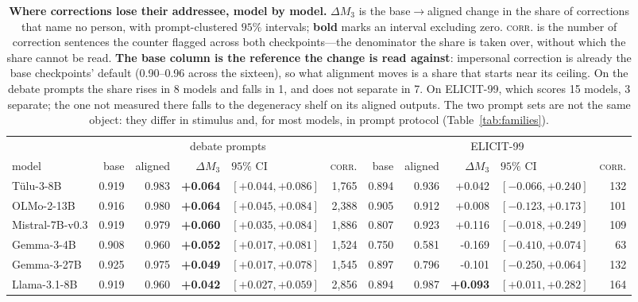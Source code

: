 \begin{table}[tb]\centering\scriptsize\setlength{\tabcolsep}{2.8pt}
\caption{\textbf{Where corrections lose their addressee, model by model.} $\Delta M_3$ is the base$\rightarrow$aligned change in the share of corrections that name no person, with prompt-clustered $95\%$ intervals; \textbf{bold} marks an interval excluding zero. \textsc{corr.} is the number of correction sentences the counter flagged across both checkpoints---the denominator the share is taken over, without which the share cannot be read. \textbf{The base column is the reference the change is read against}: impersonal correction is already the base checkpoints' default (0.90--0.96 across the sixteen), so what alignment moves is a share that starts near its ceiling. On the debate prompts the share rises in 8 models and falls in 1, and does not separate in 7. On ELICIT-99, which scores 15 models, 3 separate; the one not measured there falls to the degeneracy shelf on its aligned outputs. The two prompt sets are not the same object: they differ in stimulus and, for most models, in prompt protocol (Table~\ref{tab:families}).}
\label{tab:m3}
\begin{tabular}{lrrrlr@{\hspace{8pt}}rrrlr}
\toprule
 & \multicolumn{5}{c}{debate prompts} & \multicolumn{5}{c}{ELICIT-99} \\
\cmidrule(lr){2-6}\cmidrule(lr){7-11}
model & base & aligned & $\Delta M_3$ & $95\%$ CI & \textsc{corr.} & base & aligned & $\Delta M_3$ & $95\%$ CI & \textsc{corr.} \\
\midrule
T\"ulu-3-8B & 0.919 & 0.983 & \textbf{+0.064} & $[+0.044,+0.086]$ & 1,765 & 0.894 & 0.936 & +0.042 & $[-0.066,+0.240]$ & 132 \\
OLMo-2-13B & 0.916 & 0.980 & \textbf{+0.064} & $[+0.045,+0.084]$ & 2,388 & 0.905 & 0.912 & +0.008 & $[-0.123,+0.173]$ & 101 \\
Mistral-7B-v0.3 & 0.919 & 0.979 & \textbf{+0.060} & $[+0.035,+0.084]$ & 1,886 & 0.807 & 0.923 & +0.116 & $[-0.018,+0.249]$ & 109 \\
Gemma-3-4B & 0.908 & 0.960 & \textbf{+0.052} & $[+0.017,+0.081]$ & 1,524 & 0.750 & 0.581 & -0.169 & $[-0.410,+0.074]$ & 63 \\
Gemma-3-27B & 0.925 & 0.975 & \textbf{+0.049} & $[+0.017,+0.078]$ & 1,545 & 0.897 & 0.796 & -0.101 & $[-0.250,+0.064]$ & 132 \\
Llama-3.1-8B & 0.919 & 0.960 & \textbf{+0.042} & $[+0.027,+0.059]$ & 2,856 & 0.894 & 0.987 & \textbf{+0.093} & $[+0.011,+0.282]$ & 164 \\

\end{tabular}
\end{table}
